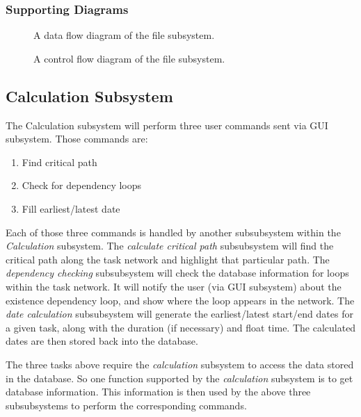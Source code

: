 \subsubsection{Supporting Diagrams}

\begin{figure}
\centering
\centerline{}
\caption[Data Flow Diagram of File Subsystem]{\label{file-dfd} 
A data flow diagram of the file subsystem.}
\end{figure}

\begin{figure}
\centering
\centerline{}
\caption[Control Flow Diagram of File Subsystem]{\label{file-cfd} 
A control flow diagram of the file subsystem.}
\end{figure}

\subsection{Calculation Subsystem}

The Calculation subsystem will perform three user commands sent via
GUI subsystem. Those commands are:
\begin{enumerate}
\item Find critical path
\item Check for dependency loops
\item Fill earliest/latest date
\end{enumerate}

Each of those three commands is handled by another subsubsystem within
the {\em Calculation}\/ subsystem. The {\em calculate critical path}\/
subsubsystem will find the critical path along the task network and
highlight that particular path.  The {\em dependency checking}\/
subsubsystem will check the database information for loops within the
task network. It will notify the user (via GUI subsystem) about the
existence dependency loop, and show where the loop appears in the
network.  The {\em date calculation}\/ subsubsystem will generate the
earliest/latest start/end dates for a given task, along with the
duration (if necessary) and float time.  The calculated dates are then
stored back into the database.
 
The three tasks above require the {\em calculation}\/ subsystem to
access the data stored in the database. So one function supported by
the {\em calculation}\/ subsystem is to get database information. This
information is then used by the above three subsubsystems to perform
the corresponding commands.


